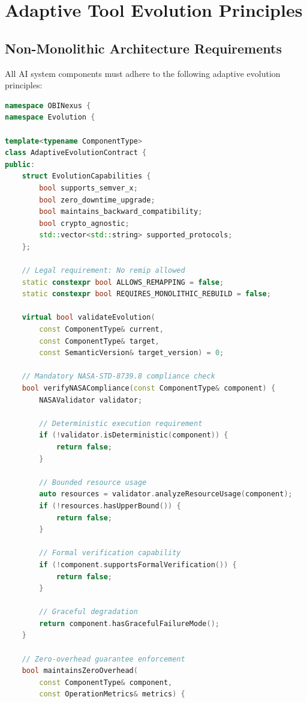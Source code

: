 \documentclass[12pt,a4paper]{article}
\begin{document}
\section{Adaptive Tool Evolution Principles}

\subsection{Non-Monolithic Architecture Requirements}

All AI system components must adhere to the following adaptive evolution principles:

\begin{lstlisting}[language=C++, caption=Adaptive Component Evolution Contract]
namespace OBINexus {
namespace Evolution {

template<typename ComponentType>
class AdaptiveEvolutionContract {
public:
    struct EvolutionCapabilities {
        bool supports_semver_x;
        bool zero_downtime_upgrade;
        bool maintains_backward_compatibility;
        bool crypto_agnostic;
        std::vector<std::string> supported_protocols;
    };

    // Legal requirement: No remip allowed
    static constexpr bool ALLOWS_REMAPPING = false;
    static constexpr bool REQUIRES_MONOLITHIC_REBUILD = false;

    virtual bool validateEvolution(
        const ComponentType& current,
        const ComponentType& target,
        const SemanticVersion& target_version) = 0;

    // Mandatory NASA-STD-8739.8 compliance check
    bool verifyNASACompliance(const ComponentType& component) {
        NASAValidator validator;
        
        // Deterministic execution requirement
        if (!validator.isDeterministic(component)) {
            return false;
        }
        
        // Bounded resource usage
        auto resources = validator.analyzeResourceUsage(component);
        if (!resources.hasUpperBound()) {
            return false;
        }
        
        // Formal verification capability
        if (!component.supportsFormalVerification()) {
            return false;
        }
        
        // Graceful degradation
        return component.hasGracefulFailureMode();
    }

    // Zero-overhead guarantee enforcement
    bool maintainsZeroOverhead(
        const ComponentType& component,
        const OperationMetrics& metrics) {
        

\end{lstlisting}
\end{document}
